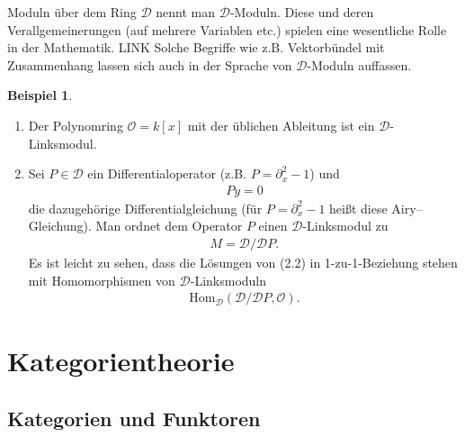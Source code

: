 \documentclass[reqno,12pt]{article}
\numberwithin{equation}{section}
\newcommand{\cD}{\mathcal{D}}
\newcommand{\cO}{\mathcal{O}}
\newcommand{\Hom}{\text{Hom}}
\theoremstyle{plain}
\theoremstyle{definition}
\newtheorem{example}[thm]{Beispiel}
\begin{document}
\bigskip
\noindent Moduln über dem Ring $\cD$ nennt man $\cD$-Moduln. Diese und deren Verallgemeinerungen (auf mehrere Variablen etc.) spielen eine wesentliche Rolle in der Mathematik. LINK Solche Begriffe wie z.B. Vektorbündel mit Zusammenhang lassen sich auch in der Sprache von $\cD$-Moduln auffassen.

\begin{example}
\
\begin{enumerate}
\item Der Polynomring $\cO = k[x]$ mit der üblichen Ableitung ist ein $\cD$-Linksmodul.

\item Sei $P \in \cD$ ein Differentialoperator (z.B. $P = \partial_x^2 - 1$) und
\begin{align}
P y = 0
\end{align}
die dazugehörige Differentialgleichung (für $P = \partial_x^2 - 1$ heißt diese Airy--Gleichung). Man ordnet dem Operator $P$ einen $\cD$-Linksmodul zu
\begin{align*}
M = \cD/\cD P.
\end{align*}
Es ist leicht zu sehen, dass die Lösungen von (2.2) in 1-zu-1-Beziehung stehen mit Homomorphismen von $\cD$-Linksmoduln
\begin{align*}
\Hom_{\cD}(\cD/\cD P , \cO).
\end{align*}
\end{enumerate}
\end{example}




\newpage
\section{Kategorientheorie}

\subsection{Kategorien und Funktoren}
\end{document}
